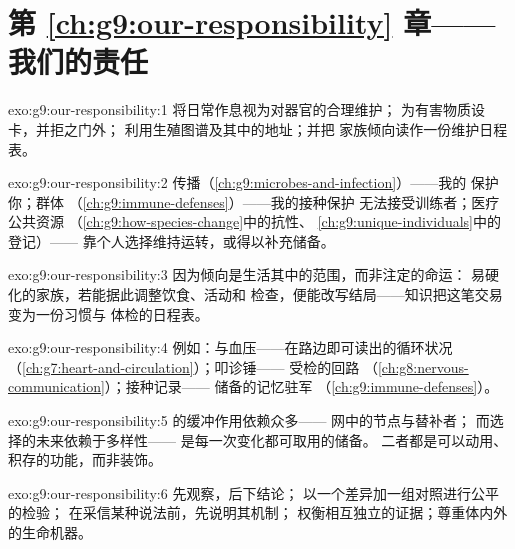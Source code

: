 \section*{第 \ref{ch:g9:our-responsibility} 章——我们的责任}

\begin{solution}{exo:g9:our-responsibility:1}
将日常作息视为对器官的合理维护；
为有害物质设卡，并拒之门外；
利用生殖图谱及其中的地址；并把
家族倾向读作一份维护日程表。
\end{solution}

\begin{solution}{exo:g9:our-responsibility:2}
传播（\cref{ch:g9:microbes-and-infection}）——我的
保护你；群体
（\cref{ch:g9:immune-defenses}）——我的接种保护
无法接受训练者；医疗公共资源
（\cref{ch:g9:how-species-change}中的抗性、
\cref{ch:g9:unique-individuals}中的登记）——
靠个人选择维持运转，或得以补充储备。
\end{solution}

\begin{solution}{exo:g9:our-responsibility:3}
因为倾向是生活其中的范围，而非注定的命运：
易硬化的家族，若能据此调整饮食、活动和
检查，便能改写结局——知识把这笔交易
变为一份习惯与
体检的日程表。
\end{solution}

\begin{solution}{exo:g9:our-responsibility:4}
例如：与血压——在路边即可读出的循环状况
（\cref{ch:g7:heart-and-circulation}）；叩诊锤——
受检的回路
（\cref{ch:g8:nervous-communication}）；接种记录——
储备的记忆驻军
（\cref{ch:g9:immune-defenses}）。
\end{solution}

\begin{solution}{exo:g9:our-responsibility:5}
的缓冲作用依赖众多——
网中的节点与替补者；
而选择的未来依赖于多样性——
是每一次变化都可取用的储备。
二者都是可以动用、积存的功能，而非装饰。
\end{solution}

\begin{solution}{exo:g9:our-responsibility:6}
先观察，后下结论；
以一个差异加一组对照进行公平的检验；
在采信某种说法前，先说明其机制；
权衡相互独立的证据；尊重体内外的生命机器。
\end{solution}

